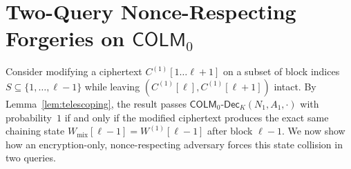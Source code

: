 \documentclass[11pt,a4paper]{article}
\theoremstyle{definition}
\theoremstyle{remark}
\newcommand{\COLMzero}{\mathsf{COLM}_0}
\begin{document}
\section{Two-Query Nonce-Respecting Forgeries on \texorpdfstring{$\COLMzero$}{COLM\_0}}
\label{sec:attack}

Consider modifying a ciphertext $C^{(1)}[1 \dots \ell+1]$ on a subset of block indices $S \subseteq \{1, \dots, \ell-1\}$ while leaving $(C^{(1)}[\ell], C^{(1)}[\ell+1])$ intact. By Lemma~\ref{lem:telescoping}, the result passes $\mathsf{COLM}_0\text{-}\mathsf{Dec}_K(N_1, A_1, \cdot)$ with probability~$1$ if and only if the modified ciphertext produces the exact same chaining state $W_{\mathrm{mix}}[\ell-1] = W^{(1)}[\ell-1]$ after block $\ell - 1$. We now show how an encryption-only, nonce-respecting adversary forces this state collision in two queries.
\end{document}
